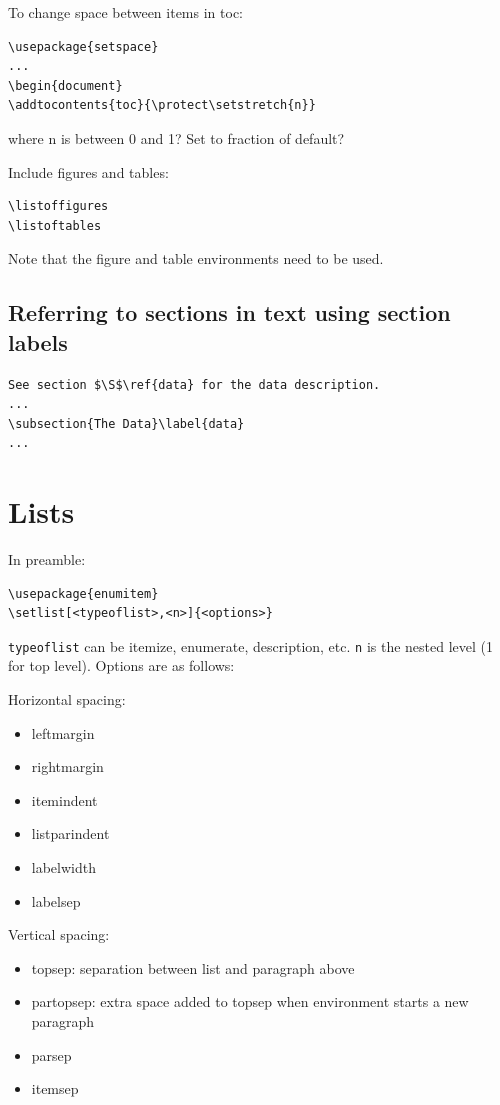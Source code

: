 \documentclass{article}
\begin{document}
To change space between items in toc:
\begin{verbatim}
\usepackage{setspace}
...
\begin{document}
\addtocontents{toc}{\protect\setstretch{n}}
\end{verbatim}
where n is between 0 and 1? Set to fraction of default?

Include figures and tables:
\begin{verbatim}
\listoffigures
\listoftables
\end{verbatim}
Note that the figure and table environments need to be used.


\subsection{Referring to sections in text using section labels}
\begin{verbatim}
See section $\S$\ref{data} for the data description.
...
\subsection{The Data}\label{data}
...
\end{verbatim}

\section{Lists}

In preamble:
\begin{verbatim}
\usepackage{enumitem}
\setlist[<typeoflist>,<n>]{<options>}
\end{verbatim}
\verb|typeoflist| can be itemize, enumerate, description, etc.
\verb|n| is the nested level (1 for top level). Options are as follows:

Horizontal spacing:
\begin{itemize}
    \item leftmargin
    \item rightmargin
    \item itemindent
    \item listparindent
    \item labelwidth
    \item labelsep
\end{itemize}
Vertical spacing:
\begin{itemize}
    \item topsep: separation between list and paragraph above
    \item partopsep: extra space added to topsep when environment starts
        a new paragraph
    \item parsep
    \item itemsep
\end{itemize}
\end{document}
